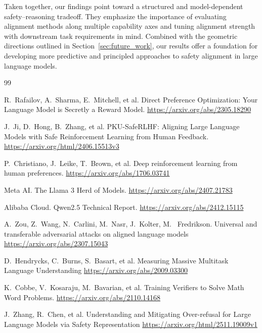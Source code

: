 \documentclass[a4paper, twocolumn, 9pt]{article}
\begin{document}
Taken together, our findings point toward a structured and model-dependent
safety--reasoning tradeoff. They emphasize the importance of evaluating alignment
methods along multiple capability axes and tuning alignment strength with downstream
task requirements in mind. Combined with the geometric directions outlined in
Section~\ref{sec:future_work}, our results offer a foundation for developing more
predictive and principled approaches to safety alignment in large language models.


\begin{thebibliography}{99}

R.~Rafailov, A.~Sharma, E.~Mitchell, et al.
\newblock Direct Preference Optimization: Your Language Model is Secretly a Reward Model.
\newblock \url{https://arxiv.org/abs/2305.18290}

J.~Ji, D.~Hong, B.~Zhang, et al.
\newblock PKU-SafeRLHF: Aligning Large Language Models with Safe Reinforcement Learning from Human Feedback.
\newblock \url{https://arxiv.org/html/2406.15513v3}

P.~Christiano, J.~Leike, T.~Brown, et al.
\newblock Deep reinforcement learning from human preferences.
\newblock \url{https://arxiv.org/abs/1706.03741}


Meta AI.
\newblock The Llama 3 Herd of Models.
\newblock \url{https://arxiv.org/abs/2407.21783}

Alibaba Cloud.
\newblock Qwen2.5 Technical Report.
\newblock \url{https://arxiv.org/abs/2412.15115}

A.~Zou, Z.~Wang, N.~Carlini, M.~Nasr, J.~Kolter, M. ~Fredrikson.
\newblock Universal and transferable
adversarial attacks on aligned language models
\newblock \url{https://arxiv.org/abs/2307.15043}

D.~Hendrycks, C.~Burns, S.~Basart, et al.
\newblock Measuring Massive Multitask Language Understanding
\newblock \url{https://arxiv.org/abs/2009.03300}

K.~Cobbe, V.~Kosaraju, M.~Bavarian, et al.
\newblock Training Verifiers to Solve Math Word Problems.
\newblock \url{https://arxiv.org/abs/2110.14168}

J.~Zhang, R.~Chen, et al.
\newblock Understanding and Mitigating Over-refusal for Large Language Models via Safety Representation
\newblock \url{https://arxiv.org/html/2511.19009v1}


\end{thebibliography}
\end{document}
